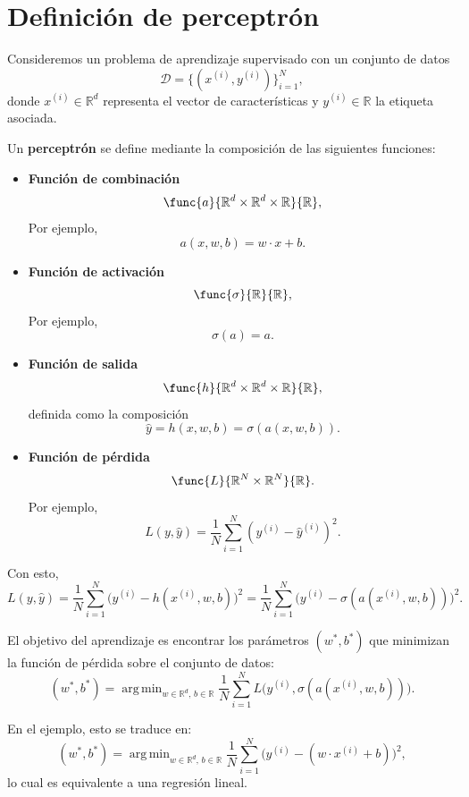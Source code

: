 \documentclass[a4,11pt]{aleph-notas}
\DeclareMathOperator*{\argmin}{arg\,min}
\begin{document}
\encabezado


\section{Definición de perceptrón}

Consideremos un problema de aprendizaje supervisado con un conjunto de datos
\[
\mathcal{D} = \{(x^{(i)}, y^{(i)})\}_{i=1}^N,
\]
donde \(x^{(i)} \in \mathbb{R}^d\) representa el vector de características y
\(y^{(i)} \in \mathbb{R}\) la etiqueta asociada.

Un \textbf{perceptrón} se define mediante la composición de las siguientes funciones:

\begin{itemize}[leftmargin=*]
    \item \textbf{Función de combinación}
    \[
        \func{a}{\mathbb{R}^d \times \mathbb{R}^d \times \mathbb{R}}{\mathbb{R}},
    \]
    Por ejemplo,
    \[
        a(x,w,b) = w\cdot  x + b.
    \]

    \item \textbf{Función de activación}
    \[
        \func{\sigma}{\mathbb{R}}{\mathbb{R}},
    \]
    Por ejemplo,
    \[
        \sigma(a) = a.
    \]

    \item \textbf{Función de salida}
    \[
        \func{h}{\mathbb{R}^d \times \mathbb{R}^d \times \mathbb{R} }{\mathbb{R}},
    \]
    definida como la composición
    \[
        \hat y = h(x,w,b) = \sigma (a(x,w,b)).
    \]

    \item \textbf{Función de pérdida}
    \[
        \func{L}{\mathbb{R}^N \times \mathbb{R}^N}{\mathbb{R}}.
    \]
    Por ejemplo,
    \[
        L(y,\hat y) = \frac{1}{N} \sum_{i=1}^N (y^{(i)} - \hat y^{(i)})^2.
    \]
\end{itemize}

Con esto, 
\[
    L(y, \hat y)
    = \frac{1}{N} \sum_{i=1}^N \bigl(y^{(i)} - h(x^{(i)},w,b)\bigr)^2=
    \frac{1}{N} \sum_{i=1}^N \bigl(y^{(i)} - \sigma(a(x^{(i)},w,b))\bigr)^2.
\]

El objetivo del aprendizaje es encontrar los parámetros \((w^\ast,b^\ast)\)
que minimizan la función de pérdida sobre el conjunto de datos:
\[
    (w^\ast,b^\ast)
    =
    \argmin_{w \in \mathbb{R}^d,\, b \in \mathbb{R}}
    \frac{1}{N} \sum_{i=1}^N L\bigl(y^{(i)}, \sigma(a(x^{(i)},w,b))\bigr).
\]

En el ejemplo, esto se traduce en:
\[
    (w^\ast,b^\ast)
    =
    \argmin_{w \in \mathbb{R}^d,\, b \in \mathbb{R}}
    \frac{1}{N} \sum_{i=1}^N \bigl(y^{(i)} - (w\cdot  x^{(i)} + b)\bigr)^2,
\]
lo cual es equivalente a una regresión lineal.
\end{document}
